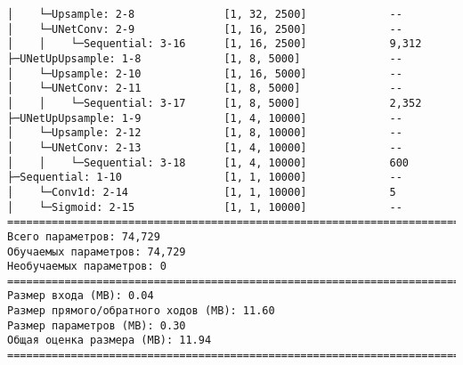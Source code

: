 \begin{verbatim}
│    └─Upsample: 2-8              [1, 32, 2500]             --
│    └─UNetConv: 2-9              [1, 16, 2500]             --
│    │    └─Sequential: 3-16      [1, 16, 2500]             9,312
├─UNetUpUpsample: 1-8             [1, 8, 5000]              --
│    └─Upsample: 2-10             [1, 16, 5000]             --
│    └─UNetConv: 2-11             [1, 8, 5000]              --
│    │    └─Sequential: 3-17      [1, 8, 5000]              2,352
├─UNetUpUpsample: 1-9             [1, 4, 10000]             --
│    └─Upsample: 2-12             [1, 8, 10000]             --
│    └─UNetConv: 2-13             [1, 4, 10000]             --
│    │    └─Sequential: 3-18      [1, 4, 10000]             600
├─Sequential: 1-10                [1, 1, 10000]             --
│    └─Conv1d: 2-14               [1, 1, 10000]             5
│    └─Sigmoid: 2-15              [1, 1, 10000]             --
=============================================================================
Всего параметров: 74,729
Обучаемых параметров: 74,729
Необучаемых параметров: 0
=============================================================================
Размер входа (MB): 0.04
Размер прямого/обратного ходов (MB): 11.60
Размер параметров (MB): 0.30
Общая оценка размера (MB): 11.94
=============================================================================

\end{verbatim}
\label{lst:unet}
